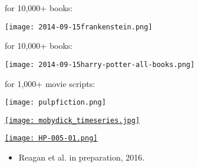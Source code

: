 

\begin{frame}[plain]
  for 10,000+ books:
  
  \centering
  \texttt{[image: 2014-09-15frankenstein.png]}
  
\end{frame}

\begin{frame}[plain]
  for 10,000+ books:
  
  \centering
  \texttt{[image: 2014-09-15harry-potter-all-books.png]}
  
\end{frame}

\begin{frame}[plain]
  for 1,000+ movie scripts:
  
  \texttt{[image: pulpfiction.png]}
  
\end{frame}

\begin{frame}
  \href{http://hedonometer.org/books.html?book=Moby\%20Dick}{\texttt{[image: mobydick\_timeseries.jpg]}}

  \footnotesize

\end{frame}

\begin{frame}[plain]
  \href{http://hedonometer.org/books.html?book=Harry\%20Potter\%20and\%20the\%20Deathly\%20Hallows}{\texttt{[image: HP-005-01.png]}}

  \begin{itemize}
  \item 
    \small
    Reagan et al. in preparation, 2016.
  \end{itemize}

\end{frame}

